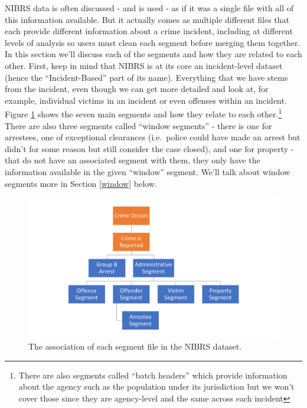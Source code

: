 \documentclass[
  12pt,
  openany]{book}
\begin{document}
NIBRS data is often discussed - and is used - as if it was a single file with all of this information available. But it actually comes as multiple different files that each provide different information about a crime incident, including at different levels of analysis so users must clean each segment before merging them together. In this section we'll discuss each of the segments and how they are related to each other. First, keep in mind that NIBRS is at its core an incident-level dataset (hence the ``Incident-Based'' part of its name). Everything that we have stems from the incident, even though we can get more detailed and look at, for example, individual victims in an incident or even offenses within an incident. Figure \ref{fig:segmentFlowchart} shows the seven main segments and how they relate to each other.\footnote{There are also segments called ``batch headers'' which provide information about the agency such as the population under its jurisdiction but we won't cover those since they are agency-level and the same across each incident} There are also three segments called ``window segments'' - there is one for arrestees, one of exceptional clearances (i.e.~police could have made an arrest but didn't for some reason but still consider the case closed), and one for property - that do not have an associated segment with them, they only have the information available in the given ``window'' segment. We'll talk about window segments more in Section \ref{window} below.

\begin{figure}

{\centering \includegraphics[width=0.9\linewidth]{images/segments_flowchart} 

}

\caption{The association of each segment file in the NIBRS dataset.}\label{fig:segmentFlowchart}
\end{figure}
\end{document}
